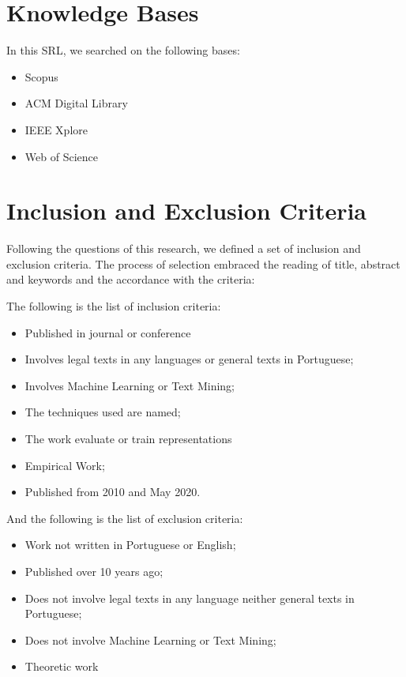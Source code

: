 \section{Knowledge Bases}

In this SRL, we searched on the following bases:

\begin{itemize}[noitemsep]
    \item Scopus
    \item ACM Digital Library
    \item IEEE Xplore
    \item Web of Science
\end{itemize}


\section{Inclusion and Exclusion Criteria}


Following the questions of this research, we defined a set of inclusion and exclusion criteria. The process of selection embraced the reading of title, abstract and keywords and the accordance with the criteria:

The following is the list of inclusion criteria:

\begin{itemize}[noitemsep]
    \item Published in journal or conference
    \item Involves legal texts in any languages or general texts in Portuguese;
    \item Involves Machine Learning or Text Mining;
    \item The techniques used are named;
    \item The work evaluate or train representations
    \item Empirical Work;
    \item Published from 2010 and May 2020.
\end{itemize}

And the following is the list of exclusion criteria:

\begin{itemize}[noitemsep]
    \item Work not written in Portuguese or English;
    \item Published over 10 years ago;
    \item Does not involve legal texts in any language neither general texts in Portuguese;
    \item Does not involve Machine Learning or Text Mining;
    \item Theoretic work
\end{itemize}

